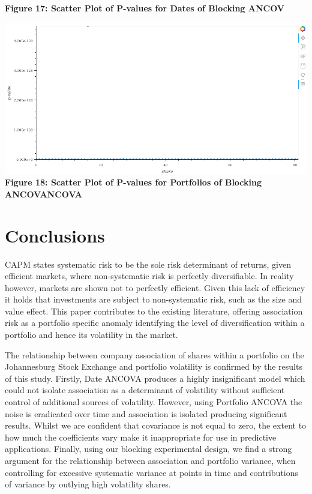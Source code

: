 \documentclass[11pt]{article}
\makeatletter
\def\maxwidth{\ifdim\Gin@nat@width>\linewidth\linewidth
    \else\Gin@nat@width\fi}
\let\Oldincludegraphics\includegraphics
\renewcommand{\includegraphics}[1]{\Oldincludegraphics[width=.8\maxwidth]{#1}}
\makeatother
\begin{document}
\textbf{Figure 17: Scatter Plot of P-values for Dates of Blocking ANCOV}

\includegraphics{../experiments/media/Scatter Plot of P-values for shares in a portfolio of Blocking Ancova.png}\\

\textbf{Figure 18: Scatter Plot of P-values for Portfolios of Blocking
ANCOVANCOVA}

\hypertarget{conclusions}{%
\section{Conclusions}\label{conclusions}}

CAPM states systematic risk to be the sole risk determinant of returns,
given efficient markets, where non-systematic risk is perfectly
diversifiable. In reality however, markets are shown not to perfectly
efficient. Given this lack of efficiency it holds that investments are
subject to non-systematic risk, such as the size and value effect. This
paper contributes to the existing literature, offering association risk
as a portfolio specific anomaly identifying the level of diversification
within a portfolio and hence its volatility in the market.

The relationship between company association of shares within a
portfolio on the Johannesburg Stock Exchange and portfolio volatility is
confirmed by the results of this study. Firstly, Date ANCOVA produces a
highly insignificant model which could not isolate association as a
determinant of volatility without sufficient control of additional
sources of volatility. However, using Portfolio ANCOVA the noise is
eradicated over time and association is isolated producing significant
results. Whilst we are confident that covariance is not equal to zero,
the extent to how much the coefficients vary make it inappropriate for
use in predictive applications. Finally, using our blocking experimental
design, we find a strong argument for the relationship between
association and portfolio variance, when controlling for excessive
systematic variance at points in time and contributions of variance by
outlying high volatility shares.
\end{document}
